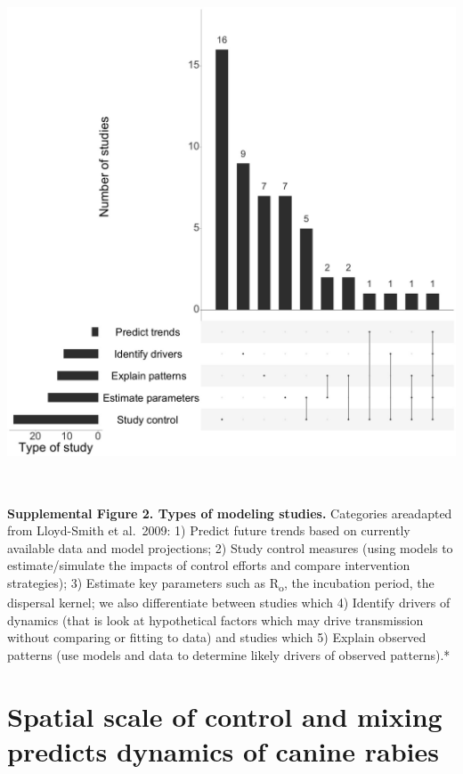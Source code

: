 \documentclass[
]{book}
\begin{document}
\includegraphics[width=6in,height=6in]{figs/ch3/image5.jpeg}

\textbf{Supplemental Figure 2. Types of modeling studies.}
Categories areadapted from Lloyd-Smith et al.~2009: 1) Predict future trends based on
currently available data and model projections; 2) Study control
measures (using models to estimate/simulate the impacts of control
efforts and compare intervention strategies); 3) Estimate key parameters
such as R\textsubscript{o}, the incubation period, the dispersal kernel; we also
differentiate between studies which 4) Identify drivers of dynamics
(that is look at hypothetical factors which may drive transmission\emph{
}without comparing or fitting to data) and studies which 5) Explain
observed patterns (use models and data to determine likely drivers of
observed patterns).*

\hypertarget{spatial-scale-of-control-and-mixing-predicts-dynamics-of-canine-rabies}{%
\chapter{Spatial scale of control and mixing predicts dynamics of canine rabies}\label{spatial-scale-of-control-and-mixing-predicts-dynamics-of-canine-rabies}}
\end{document}

